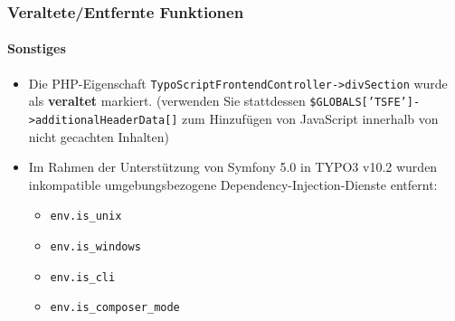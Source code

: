 \begin{frame}[fragile]
	\frametitle{Veraltete/Entfernte Funktionen}
	\framesubtitle{Sonstiges}

	\lstset{basicstyle=\tiny\ttfamily}

	\begin{itemize}

		\item Die PHP-Eigenschaft \texttt{TypoScriptFrontendController->divSection} wurde als \textbf{veraltet} markiert.\newline
			\smaller
				(verwenden Sie stattdessen \texttt{\$GLOBALS['TSFE']->additionalHeaderData[]} zum Hinzufügen von JavaScript innerhalb von nicht gecachten Inhalten)
			\normalsize

		\item Im Rahmen der Unterstützung von Symfony 5.0 in TYPO3 v10.2 wurden inkompatible umgebungsbezogene Dependency-Injection-Dienste entfernt:

			\begin{itemize}
				\item \texttt{env.is\_unix}
				\item \texttt{env.is\_windows}
				\item \texttt{env.is\_cli}
				\item \texttt{env.is\_composer\_mode}
			\end{itemize}

	\end{itemize}

\end{frame}

